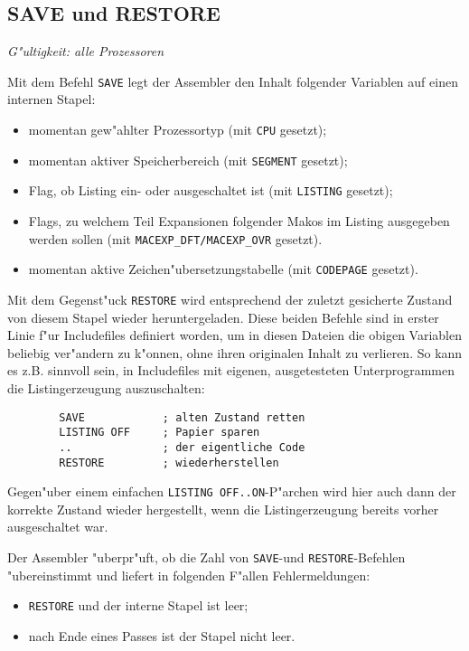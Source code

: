 \documentclass[12pt,a4paper,twoside]{report}
\makeatletter
\newcommand{\tty}[1]{{\tt #1}}
\newcommand{\ttindex}[1]{\index{#1@{\tt #1}}}
\makeatother
\begin{document}
\subsection{SAVE und RESTORE}
\ttindex{SAVE}\ttindex{RESTORE}

{\em G"ultigkeit: alle Prozessoren}

Mit dem Befehl \tty{SAVE} legt der Assembler den Inhalt folgender
Variablen auf einen internen Stapel:
\begin{itemize}
\item{momentan gew"ahlter Prozessortyp (mit \tty{CPU} gesetzt);}
\item{momentan aktiver Speicherbereich (mit \tty{SEGMENT} gesetzt);}
\item{Flag, ob Listing ein- oder ausgeschaltet ist (mit \tty{LISTING}
      gesetzt);}
\item{Flags, zu welchem Teil Expansionen folgender Makos im Listing
      ausgegeben werden sollen (mit \tty{MACEXP\_DFT/MACEXP\_OVR}
      gesetzt).}
\item{momentan aktive Zeichen"ubersetzungstabelle (mit \tty{CODEPAGE}
      gesetzt).}
\end{itemize}
Mit dem Gegenst"uck \tty{RESTORE} wird entsprechend der zuletzt
gesicherte Zustand von diesem Stapel wieder heruntergeladen.  Diese beiden
Befehle sind in erster Linie f"ur Includefiles definiert worden, um
in diesen Dateien die obigen Variablen beliebig ver"andern zu k"onnen,
ohne ihren originalen Inhalt zu verlieren.  So kann es z.B. sinnvoll sein,
in Includefiles mit eigenen, ausgetesteten Unterprogrammen die
Listingerzeugung auszuschalten:
\begin{verbatim}
        SAVE            ; alten Zustand retten
        LISTING OFF     ; Papier sparen
        ..              ; der eigentliche Code
        RESTORE         ; wiederherstellen
\end{verbatim}
Gegen"uber einem einfachen \tty{LISTING OFF..ON}-P"archen wird hier
auch dann der korrekte Zustand wieder hergestellt, wenn die Listingerzeugung
bereits vorher ausgeschaltet war.
\par
Der Assembler "uberpr"uft, ob die Zahl von \tty{SAVE}-und \tty{RESTORE}-Befehlen
"ubereinstimmt und liefert in folgenden F"allen Fehlermeldungen:
\begin{itemize}
\item{\tty{RESTORE} und der interne Stapel ist leer;}
\item{nach Ende eines Passes ist der Stapel nicht leer.}
\end{itemize}
\end{document}
